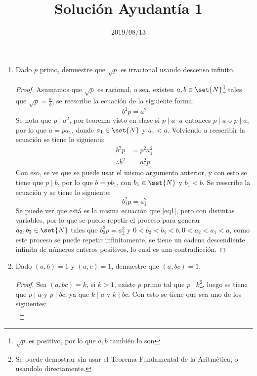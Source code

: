\documentclass{ayudantia}
\title{Solución Ayudantía 1}
\date{2019/08/13}
\begin{document}
\maketitle
\begin{enumerate}
    \item Dado \(p\) primo, demuestre que \(\sqrt{p}\) es irracional usando descenso infinito.
          \begin{proof}
              Asumamos que \(\sqrt{p}\) es racional, o sea, existen \(a,b\in\set{N}\)\footnote{\(\sqrt{p}\) es positivo, por lo que \(a,b\) también lo son} tales que \(\sqrt{p}=\frac{a}{b}\), se reescribe la ecuación de la siguiente forma:
              \begin{equation}
                  b^2p=a^2\label{eq1}
              \end{equation}
              Se nota que \(p\mid a^2\), por teorema visto en clase si \(p\mid a\cdot a\) entonces \(p\mid a\) o \(p\mid a\), por lo que \(a=pa_1\), donde \(a_1\in\set{N}\) y \(a_1<a\). Volviendo a reescribir la ecuación se tiene lo siguiente:
              \begin{align*}
                  b^2p           & =p^2a_1^2 \\
                  \therefore b^2 & =a_1^2p
              \end{align*}
              Con eso, se ve que se puede usar el mismo argumento anterior, y con esto se tiene que \(p\mid b\), por lo que \(b=pb_1\), con \(b_1\in\set{N}\) y \(b_1<b\). Se reescribe la ecuación y se tiene lo siguiente:
              \[
                  b^2_1p=a_1^2
              \]
              Se puede ver que está es la misma ecuación que \eqref{eq1}, pero con distintas variables, por lo que se puede repetir el proceso para generar \(a_2,b_2\in\set{N}\) tales que \(b_2^2p=a_2^2\) y \(0<b_2<b_1<b,0<a_2<a_1<a\), como este proceso se puede repetir infinitamente, se tiene un cadena descendiente infinita de números enteros positivos, lo cual es una contradicción.
          \end{proof}
    \item Dado \((a,b)=1\) y \((a,c)=1\), demuestre que \((a,bc)=1\).
          \begin{proof}
            Sea \((a,bc)=k\), si \(k>1\), existe \(p\) primo tal que \(p\mid k\)\footnote{Se puede demostrar sin usar el Teorema Fundamental de la Aritmética, o usandolo directamente.}, luego se tiene que \(p\mid a\) y \(p\mid bc\), ya que \(k\mid a\) y \(k\mid bc\). Con esto se tiene que sea uno de los siguientes:
            \begin{align*}

\end{align*}
\end{proof}
\end{enumerate}
\end{document}
